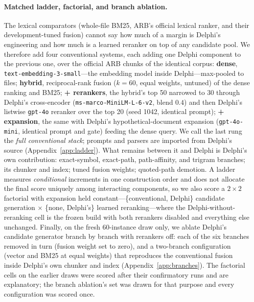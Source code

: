 \documentclass{article}
\newcommand{\system}{Delphi}
\begin{document}
\paragraph{Matched ladder, factorial, and branch ablation.} The lexical comparators (whole-file BM25, ARB's official lexical ranker, and their development-tuned fusion) cannot say how much of a margin is \system{}'s engineering and how much is a learned reranker on top of any candidate pool. We therefore add four conventional systems, each adding one \system{} component to the previous one, over the official ARB chunks of the identical corpus: \textbf{dense}, \texttt{text-embedding-3-small}---the embedding model inside \system{}---max-pooled to files; \textbf{hybrid}, reciprocal-rank fusion ($k{=}60$, equal weights, untuned) of the dense ranking and BM25; \textbf{+ rerankers}, the hybrid's top 50 narrowed to 30 through \system{}'s cross-encoder (\texttt{ms-marco-MiniLM-L-6-v2}, blend $0.4$) and then \system{}'s listwise \texttt{gpt-4o} reranker over the top 20 (seed 1042, identical prompt); \textbf{+ expansion}, the same with \system{}'s hypothetical-document expansion (\texttt{gpt-4o-mini}, identical prompt and gate) feeding the dense query. We call the last rung the \emph{full conventional stack}; prompts and parsers are imported from \system{}'s source (Appendix~\ref{app:ladder}). What remains between it and \system{} is \system{}'s own contribution: exact-symbol, exact-path, path-affinity, and trigram branches; its chunker and index; tuned fusion weights; quoted-path demotion. A ladder measures \emph{conditional} increments in one construction order and does not allocate the final score uniquely among interacting components, so we also score a $2\times2$ factorial with expansion held constant---\{conventional, \system{}\} candidate generation $\times$ \{none, \system{}'s\} learned reranking---where the \system{}-without-reranking cell is the frozen build with both rerankers disabled and everything else unchanged. Finally, on the fresh 60-instance draw only, we ablate \system{}'s candidate generator branch by branch with rerankers off: each of the six branches removed in turn (fusion weight set to zero), and a two-branch configuration (vector and BM25 at equal weights) that reproduces the conventional fusion inside \system{}'s own chunker and index (Appendix~\ref{app:branches}). The factorial cells on the earlier draws were scored after their confirmatory runs and are explanatory; the branch ablation's set was drawn for that purpose and every configuration was scored once.
\end{document}
